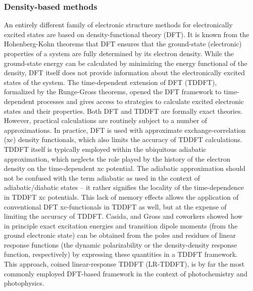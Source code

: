\documentclass[9pt,bestpractices]{livecoms}
\begin{document}
\subsubsection{Density-based methods}
\label{sec:dftbased}
An entirely different family of electronic structure methods for electronically excited states are based on density-functional theory (DFT). It is known from the Hohenberg-Kohn theorems\cite{hohenberg64} that DFT ensures that the ground-state (electronic) properties of a system are fully determined by its electron density. While the ground-state energy can be calculated by minimizing the energy functional of the density, DFT itself does not provide information about the electronically excited states of the system. The time-dependent extension of DFT (TDDFT),\cite{tddftcarsten} formalized by the Runge-Gross theorems,\cite{Runge84} opened the DFT framework to time-dependent processes and gives access to strategies to calculate excited electronic states and their properties. Both DFT and TDDFT are formally exact theories. However, practical calculations are routinely subject to a number of approximations. In practice, DFT is used with approximate exchange-correlation (xc) density functionals, which also limits the accuracy of TDDFT calculations. TDDFT itself is typically employed within the ubiquitous adiabatic approximation, which neglects the role played by the history of the electron density on the time-dependent xc potential.\cite{casida2012progress,tddftcarsten} The adiabatic approximation should not be confused with the term adiabatic as used in the context of adiabatic/diabatic states -- it rather signifies the locality of the time-dependence in TDDFT xc potentials. This lack of memory effects allows the application of conventional DFT xc-functionals in TDDFT as well, but at the expense of limiting the accuracy of TDDFT. Casida\cite{casida95}, and Gross and coworkers\cite{petersilka_excitation_1996} showed how in principle exact excitation energies and transition dipole moments (from the ground electronic state) can be obtained from the poles and residues of linear response functions (the dynamic polarizability or the density-density response function, respectively) by expressing these quantities in a TDDFT framework.\cite{tddftcarsten,agostini2018tddft} This approach, coined linear-response TDDFT (LR-TDDFT), is by far the most commonly employed DFT-based framework in the context of photochemistry and photophysics.
\end{document}
